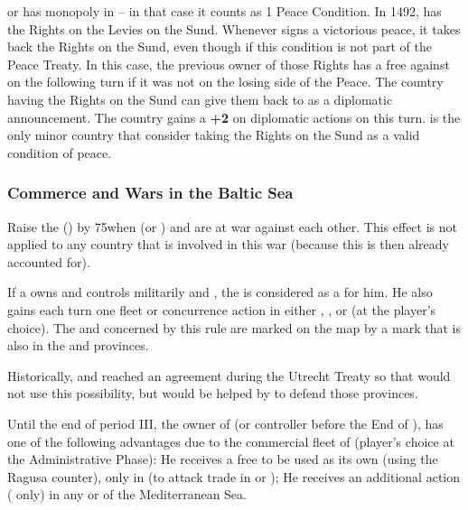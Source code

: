 or has monopoly in  -- in that case it counts as 1 Peace
Condition.
\bparag In 1492,  has the Rights on the Levies on the Sund.
\bparag Whenever  signs a victorious peace, it takes back the
Rights on the Sund, even though if this condition is not part of the Peace
Treaty. In this case, the previous owner of those Rights has a free \CB
against  on the following turn if it was not on the losing side
of the Peace.
\bparag The country having the Rights on the Sund can give them back to
 as a diplomatic announcement. The country gains a {\bf +2} on
diplomatic actions on  this turn.
\bparag {} is the only minor country that consider taking the
Rights on the Sund as a valid condition of peace.


\subsubsection{Commerce and Wars in the Baltic Sea}
\aparag Raise the  () by
75\ducats when \SUE (or ) and  are at war against
each other.
\aparag This effect is not applied to any country that is involved in this war
(because this is then already accounted for).

\aparag If a \MAJ owns and controls militarily  and
, the  is considered as a \CTZ for him.
\bparag He also gains each turn one fleet or concurrence action in either
, ,  or  (at the player's
choice).  \bparag The \CTZ and \STZ concerned by this rule are marked on the
map by a mark that is also in the  and 
provinces.
\begin{designnote}
  Historically, \SPA and \HOL reached an agreement during the Utrecht Treaty
  so that \SPA would not use this possibility, but would be helped by \HOL to
  defend those provinces.
\end{designnote}


\label{chSpecific:Ragusa}
\aparag Until the end of period III, the owner of  (or
controller before the End of ), has one of the
following advantages due to the commercial fleet of  (player's
choice at the Administrative Phase):
\bparag He receives a free \corsaire\facemoins to be used as its own (using
the Ragusa counter), only in  (to attack trade in
 or );
\bparag He receives an additional action
( only) in any \STZ or \CTZ of the Mediterranean Sea.


